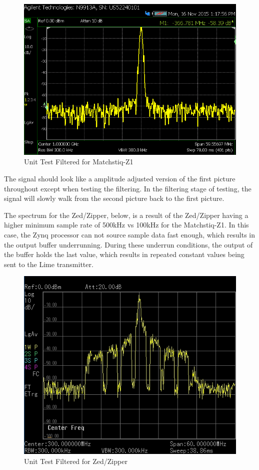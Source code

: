 \documentclass{article}
\begin{document}
\begin{flushleft}
	\begin{figure}[ht]
		\centerline{\includegraphics[scale=0.7]{YesFilter}}
		\caption{Unit Test Filtered for Matchstiq-Z1}
		\label{fig:filt}
	\end{figure}

	The signal should look like a amplitude adjusted version of the first picture throughout except when testing the filtering.  In the filtering stage of testing, the signal will slowly walk from the second picture back to the first picture.

\pagebreak
	The spectrum for the Zed/Zipper, below, is a result of the Zed/Zipper having a higher minimum sample rate of 500kHz vs 100kHz for the Matchstiq-Z1. In this case, the Zynq processor can not source sample data fast enough, which results in the output buffer underrunning. During these underrun conditions, the output of the buffer holds the last value, which results in repeated constant values being sent to the Lime transmitter.

	\begin{figure}[ht]
		\centerline{\includegraphics[scale=0.7]{NoFilter_zed_zipper}}
		\caption{Unit Test Filtered for Zed/Zipper}
		\label{fig:nofilt}
	\end{figure}
	\newpage


\end{flushleft}
\end{document}

